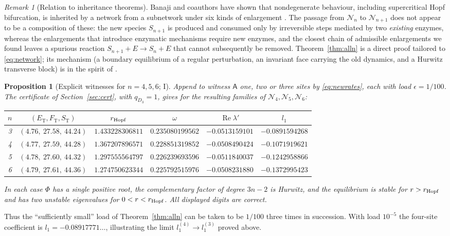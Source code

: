\documentclass[11pt,a4paper]{article}
\theoremstyle{plain}
\newtheorem{proposition}[theorem]{Proposition}
\theoremstyle{definition}
\theoremstyle{remark}
\newtheorem{remark}[theorem]{Remark}
\newcommand{\cN}{\mathcal N}
\newcommand{\ET}{E_{\mathrm T}}
\newcommand{\FT}{F_{\mathrm T}}
\newcommand{\ST}{S_{\mathrm T}}
\newcommand{\WA}{\mathsf A}
\DeclareMathOperator{\Ree}{Re}
\newcommand{\evI}{\textsf{I}}
\begin{document}
\begin{remark}[Relation to inheritance theorems]\label{rem:inheritance}
Banaji and coauthors have shown that nondegenerate behaviour, including supercritical Hopf bifurcation, is inherited by a network from a subnetwork under six kinds of enlargement \cite{Banaji18,BanajiBorosHofbauer22,Banaji23,BanajiBorosHofbauer25}. The passage from $\cN_n$ to $\cN_{n+1}$ does not appear to be a composition of these: the new species $S_{n+1}$ is produced and consumed only by irreversible steps mediated by two \emph{existing} enzymes, whereas the enlargements that introduce enzymatic mechanisms require new enzymes, and the closest chain of admissible enlargements we found leaves a spurious reaction $S_{n+1}+E\to S_n+E$ that cannot subsequently be removed. Theorem~\ref{thm:alln} is a direct proof tailored to \eqref{eq:network}; its mechanism (a boundary equilibrium of a regular perturbation, an invariant face carrying the old dynamics, and a Hurwitz transverse block) is in the spirit of \cite{BanajiBorosHofbauer25}.
\end{remark}

\begin{proposition}[Explicit witnesses for $n=4,5,6$; \evI]\label{prop:explicit}
Append to witness $\WA$ one, two or three sites by \eqref{eq:newrates}, each with load $\epsilon=1/100$. The certificate of Section~\ref{sec:cert}, with $q_{D_3}=1$, gives for the resulting families of $\cN_4,\cN_5,\cN_6$:
\begin{center}\small
\begin{tabular}{cccccc}
\toprule
$n$ & $(\ET,\FT,\ST)$ & $r_{\rm Hopf}$ & $\omega$ & $\Ree\lambda'$ & $l_1$\\
\midrule
3 & $(4.76,\ 27.58,\ 44.24)$ & $1.433228306811$ & $0.235080199562$ & $-0.0513159101$ & $-0.0891594268$\\
4 & $(4.77,\ 27.59,\ 44.28)$ & $1.367207896571$ & $0.228851319852$ & $-0.0508490424$ & $-0.1071919621$\\
5 & $(4.78,\ 27.60,\ 44.32)$ & $1.297555564797$ & $0.226239693596$ & $-0.0511840037$ & $-0.1242958866$\\
6 & $(4.79,\ 27.61,\ 44.36)$ & $1.274750623344$ & $0.225792515976$ & $-0.0508231880$ & $-0.1372995423$\\
\bottomrule
\end{tabular}
\end{center}
In each case $\Phi$ has a single positive root, the complementary factor of degree $3n-2$ is Hurwitz, and the equilibrium is stable for $r>r_{\rm Hopf}$ and has two unstable eigenvalues for $0<r<r_{\rm Hopf}$. All displayed digits are correct.
\end{proposition}
Thus the ``sufficiently small'' load of Theorem~\ref{thm:alln} can be taken to be $1/100$ three times in succession. With load $10^{-5}$ the four-site coefficient is $l_1=-0.08917771\ldots$, illustrating the limit $l_1^{(4)}\to l_1^{(3)}$ proved above.
\end{document}
